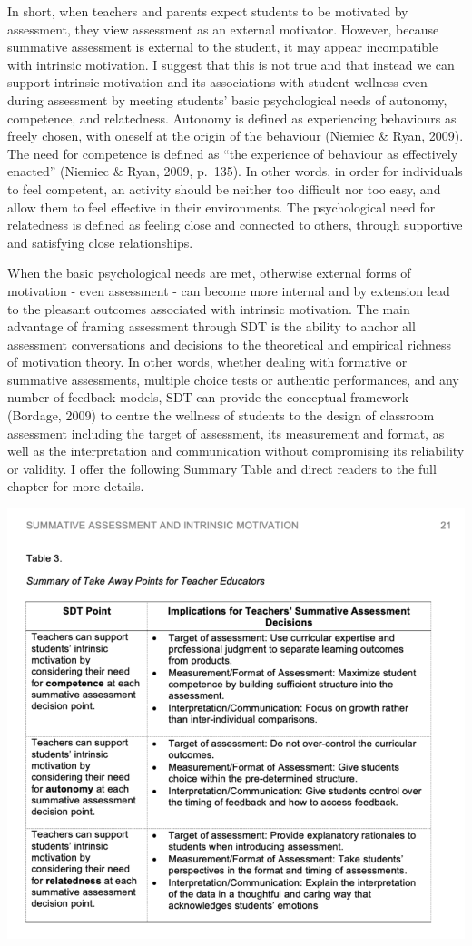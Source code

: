 \documentclass[
]{book}
\begin{document}
In short, when teachers and parents expect students to be motivated by assessment, they view assessment as an external motivator. However, because summative assessment is external to the student, it may appear incompatible with intrinsic motivation. I suggest that this is not true and that instead we can support intrinsic motivation and its associations with student wellness even during assessment by meeting students' basic psychological needs of autonomy, competence, and relatedness. Autonomy is defined as experiencing behaviours as freely chosen, with oneself at the origin of the behaviour (Niemiec \& Ryan, 2009). The need for competence is defined as ``the experience of behaviour as effectively enacted'' (Niemiec \& Ryan, 2009, p.~135). In other words, in order for individuals to feel competent, an activity should be neither too difficult nor too easy, and allow them to feel effective in their environments. The psychological need for relatedness is defined as feeling close and connected to others, through supportive and satisfying close relationships.

When the basic psychological needs are met, otherwise external forms of motivation - even assessment - can become more internal and by extension lead to the pleasant outcomes associated with intrinsic motivation. The main advantage of framing assessment through SDT is the ability to anchor all assessment conversations and decisions to the theoretical and empirical richness of motivation theory. In other words, whether dealing with formative or summative assessments, multiple choice tests or authentic performances, and any number of feedback models, SDT can provide the conceptual framework (Bordage, 2009) to centre the wellness of students to the design of classroom assessment including the target of assessment, its measurement and format, as well as the interpretation and communication without compromising its reliability or validity. I offer the following Summary Table and direct readers to the full chapter for more details.

\includegraphics{Content/Table3.png}
\end{document}
